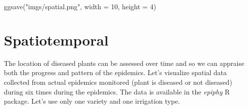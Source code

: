 \documentclass[
  letterpaper,
  DIV=11,
  numbers=noendperiod]{scrreprt}
\newenvironment{Shaded}{\begin{snugshade}}{\end{snugshade}}
\newcommand{\AttributeTok}[1]{\textcolor[rgb]{0.40,0.45,0.13}{#1}}
\newcommand{\DecValTok}[1]{\textcolor[rgb]{0.68,0.00,0.00}{#1}}
\newcommand{\FunctionTok}[1]{\textcolor[rgb]{0.28,0.35,0.67}{#1}}
\newcommand{\NormalTok}[1]{\textcolor[rgb]{0.00,0.23,0.31}{#1}}
\newcommand{\OtherTok}[1]{\textcolor[rgb]{0.00,0.23,0.31}{#1}}
\newcommand{\SpecialCharTok}[1]{\textcolor[rgb]{0.37,0.37,0.37}{#1}}
\newcommand{\StringTok}[1]{\textcolor[rgb]{0.13,0.47,0.30}{#1}}
\begin{document}
\begin{Shaded}
\begin{Highlighting}[]
\FunctionTok{ggsave}\NormalTok{(}\StringTok{"imgs/spatial.png"}\NormalTok{, }\AttributeTok{width =} \DecValTok{10}\NormalTok{, }\AttributeTok{height =} \DecValTok{4}\NormalTok{)}
\end{Highlighting}
\end{Shaded}

\hypertarget{spatiotemporal}{%
\section{Spatiotemporal}\label{spatiotemporal}}

The location of diseased plants can be assessed over time and so we can
appraise both the progress and pattern of the epidemics. Let's visualize
spatial data collected from actual epidemics monitored (plant is
diseased or not diseased) during six times during the epidemics. The
data is available in the \emph{epiphy} R package. Let's use only one
variety and one irrigation type.

\begin{Shaded}
\end{Shaded}
\end{document}
